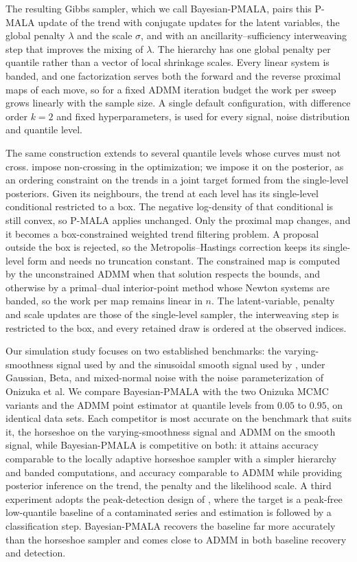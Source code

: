 The resulting Gibbs sampler, which we call Bayesian-PMALA, pairs this P-MALA update of the trend with conjugate updates for the latent variables, the global penalty $\lambda$ and the scale $\sigma$, and with an ancillarity--sufficiency interweaving step \citep{yu2011center} that improves the mixing of $\lambda$. The hierarchy has one global penalty per quantile rather than a vector of local shrinkage scales. Every linear system is banded, and one factorization serves both the forward and the reverse proximal maps of each move, so for a fixed ADMM iteration budget the work per sweep grows linearly with the sample size. A single default configuration, with difference order $k=2$ and fixed hyperparameters, is used for every signal, noise distribution and quantile level.

The same construction extends to several quantile levels whose curves must not cross. \citet{brantley2020baseline} impose non-crossing in the optimization; we impose it on the posterior, as an ordering constraint on the trends in a joint target formed from the single-level posteriors. Given its neighbours, the trend at each level has its single-level conditional restricted to a box. The negative log-density of that conditional is still convex, so P-MALA applies unchanged. Only the proximal map changes, and it becomes a box-constrained weighted trend filtering problem. A proposal outside the box is rejected, so the Metropolis--Hastings correction keeps its single-level form and needs no truncation constant. The constrained map is computed by the unconstrained ADMM when that solution respects the bounds, and otherwise by a primal--dual interior-point method whose Newton systems are banded, so the work per map remains linear in $n$. The latent-variable, penalty and scale updates are those of the single-level sampler, the interweaving step is restricted to the box, and every retained draw is ordered at the observed indices.

Our simulation study focuses on two established benchmarks: the varying-smoothness signal used by \citet{onizuka2024fast} and the sinusoidal smooth signal used by \citet{brantley2020baseline}, under Gaussian, Beta, and mixed-normal noise with the noise parameterization of Onizuka et al. We compare Bayesian-PMALA with the two Onizuka MCMC variants and the ADMM point estimator at quantile levels from $0.05$ to $0.95$, on identical data sets. Each competitor is most accurate on the benchmark that suits it, the horseshoe on the varying-smoothness signal and ADMM on the smooth signal, while Bayesian-PMALA is competitive on both: it attains accuracy comparable to the locally adaptive horseshoe sampler with a simpler hierarchy and banded computations, and accuracy comparable to ADMM while providing posterior inference on the trend, the penalty and the likelihood scale. A third experiment adopts the peak-detection design of \citet{brantley2020baseline}, where the target is a peak-free low-quantile baseline of a contaminated series and estimation is followed by a classification step. Bayesian-PMALA recovers the baseline far more accurately than the horseshoe sampler and comes close to ADMM in both baseline recovery and detection.

